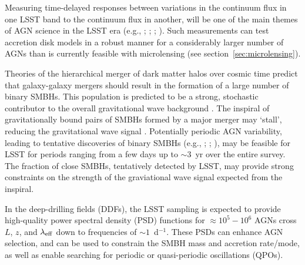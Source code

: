 Measuring time-delayed responses between variations in the continuum flux
in one LSST band to the continuum flux in another, will be one of the
main themes of AGN science in the LSST era (e.g., \citet{Chelouche2013};
\citet{CheloucheandZucker2013}; \citet{EdelsonEtal2015}; \citet{FausnaughEtal2015}).
Such measurements can test accretion disk models in a robust manner
for a considerably larger number of AGNs than is currently feasible
with microlensing (see section~\ref{sec:microlensing}).

Theories of the hierarchical merger of dark matter halos over cosmic
time predict that galaxy-galaxy mergers should result in the formation
of a large number of binary SMBHs. This population is predicted to be a strong,
stochastic contributor to the overall gravitational wave background
\citep{2015arXiv151105564T}. The inspiral of gravitationally bound pairs of
SMBHs formed by a major merger may `stall', reducing the gravitational wave
signal \citep{2014SSRv..183..189C}. Potentially periodic AGN variability,
leading to tentative discoveries of binary SMBHs (e.g.,
\citet{2015Natur.525..351D}; \citet{GrahamEtal2015}; \citet{LiuEtal2015}),
may be feasible for LSST for periods ranging from a few
days up to $\sim3$~yr over the entire survey. The fraction of close SMBHs,
tentatively detected by LSST, may provide strong constraints on the strength
of the graviational wave signal expected from the inspiral.

In the deep-drilling fields (DDFs), the LSST sampling is expected to provide
high-quality power spectral density (PSD) functions for $\approx10^{5} - 10^{6}$
AGNs cross $L$, $z$, and $\lambda_{\rm eff}$ down to frequencies of $\sim1$~d$^{-1}$.
These PSDs can enhance AGN selection, and can be used to constrain the SMBH
mass and accretion rate/mode, as well as enable searching for periodic or
quasi-periodic oscillations (QPOs).
%
%



